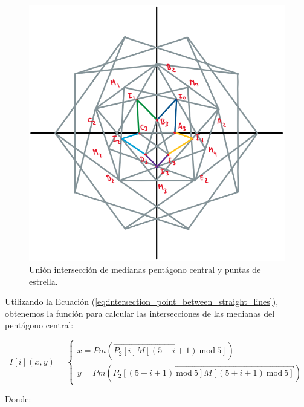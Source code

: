 \documentclass[oneside, a4paper]{article}
\begin{document}
            \begin{figure}[H]
                \centering
                \includegraphics[scale=0.5]{star_union_to_median_intersections.png}
                \caption{Unión intersección de medianas pentágono central y puntas de estrella.}
                \label{fig:star_union_to_median_intersections}
            \end{figure}

            Utilizando la Ecuación (\ref{eq:intersection_point_between_straight_lines}), obtenemos la función para calcular las intersecciones de las medianas del pentágono central:

            \begin{equation}
                I[i](x, y) =
                \begin{cases}
                    x = Pm(\overrightarrow{P_{2}[i]M[(5 + i + 1) \: \textrm{mod} \: 5]}) \\
                    y = Pm(\overrightarrow{P_{2}[(5 + i + 1) \: \textrm{mod} \: 5]M[(5 + i + 1) \: \textrm{mod} \: 5]})
                \end{cases}
                \label{eq:intersection_median_points_central_pentagon}
            \end{equation}

            Donde:
\end{document}

